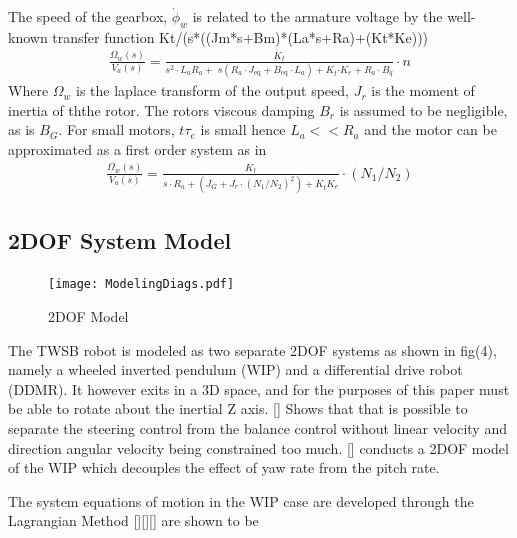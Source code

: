     The speed of the gearbox, $\dot\phi_w$ is related to the armature voltage by the well-known transfer function  Kt/(s*((Jm*s+Bm)*(La*s+Ra)+(Kt*Ke)))
    \begin{equation}
        \begin{aligned}
            \frac{\Omega_w \left(s\right)}{V_a \left(s\right)}=\frac{K_t }{s^2 \cdot L_a R_a +\;s\left(R_a \cdot J_{\mathrm{eq}} +B_{\mathrm{eq}} \cdot L_a \right)+K_t {\cdot K}_e +R_a \cdot B_q }\cdot n
        \end{aligned}
    \end{equation}
    Where $\Omega_w$ is the laplace transform of the output speed, $J_r$ is the moment of inertia of ththe rotor.
    The rotors viscous damping $B_r$ is assumed to be negligible, as is $B_G$. 
    For small motors, $t\tau_e$ is small hence $L_a << R_a$ and the motor can be approximated as a first order system as in 
    \begin{equation}
        \begin{aligned}
            \frac{\Omega_w \left(s\right)}{V_a \left(s\right)}=\frac{K_t }{s\cdot R_a + \left(J_G +{J_r \cdot \left(N_1/N_2\right)}^2 \right)+K_t K_e }\cdot\left(N_1/N_2\right)
        \end{aligned}
    \end{equation}

    \pagebreak{}


    \subsection{2DOF System Model}

    \begin{figure}[H]
        \texttt{[image: ModelingDiags.pdf]}
        \caption{2DOF Model}
    \end{figure}

    The TWSB robot is modeled as two separate 2DOF systems as shown in fig(4), 
    namely a wheeled inverted pendulum (WIP) and a differential drive robot (DDMR).
    It however exits in a 3D space, and for the purposes of this paper must be able to rotate about the inertial Z axis. 
    [] Shows that that is possible to separate the steering control from the balance control 
    without linear velocity and direction angular velocity being constrained too much. 
    [] conducts a 2DOF model of the WIP which  decouples the effect of yaw rate from the pitch rate. 

    The system equations of motion in the WIP case are developed through the Lagrangian Method [][][] are shown to be 
    
